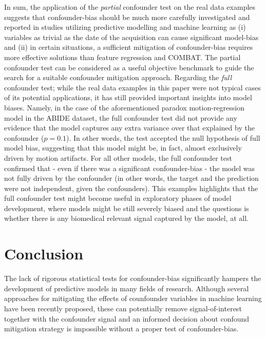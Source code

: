 \documentclass{article}
\begin{document}
 In sum, the application of the \emph{partial} confounder test on the real data examples suggests that confounder-bias should be much more carefully investigated and reported in studies utilizing predictive modelling and machine learning as (i) variables as trivial as the date of the acquisition can cause significant model-bias and (ii) in certain situations, a sufficient mitigation of confounder-bias requires more effective solutions than feature regression and COMBAT. The partial confounder test can be considered as a useful objective benchmark to guide the search for a suitable confounder mitigation approach.
 Regarding the \emph{full} confounder test; while the real data examples in this paper were not typical cases of its potential applications, it has still provided important insights into model biases. Namely, in the case of the aforementioned paradox motion-regression model in the ABIDE dataset, the full confounder test did not provide any evidence that the model captures any extra variance over that explained by the confounder ($p=0.1$). In other words, the test accepted the null hypothesis of full model bias, suggesting that this model might be, in fact, almost exclusively driven by motion artifacts.
For all other models, the full confounder test confirmed that - even if there was a significant confounder-bias - the model was not fully driven by the confounder (in other words, the target and the prediction were not independent, given the confounders).
This examples highlights that the full confounder test might become useful in exploratory phases of model development, where models might be still severely biased and the questions is whether there is any biomedical relevant signal captured by the model, at all.


\section{Conclusion}

The lack of rigorous statistical tests for confounder-bias significantly hampers the development of predictive models in many fields of research. Although several approaches for mitigating the effects of counfounder variables in machine learning have been recently proposed, these can potentially remove signal-of-interest together with the confounder signal and an informed decision about confound mitigation strategy is impossible without a proper test of confounder-bias.
\end{document}
